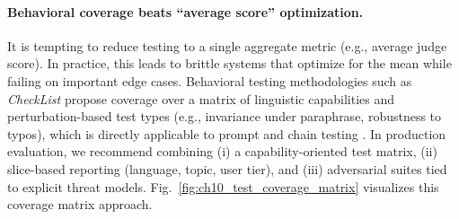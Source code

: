 \paragraph{Behavioral coverage beats ``average score'' optimization.}
It is tempting to reduce testing to a single aggregate metric (e.g., average judge score). In practice, this leads to brittle systems that optimize for the mean while failing on important edge cases.
Behavioral testing methodologies such as \emph{CheckList} propose coverage over a matrix of linguistic capabilities and perturbation-based test types (e.g., invariance under paraphrase, robustness to typos), which is directly applicable to prompt and chain testing \cite{ribeiro2020checklist}.
In production evaluation, we recommend combining (i) a capability-oriented test matrix, (ii) slice-based reporting (language, topic, user tier), and (iii) adversarial suites tied to explicit threat models.
Fig.~\ref{fig:ch10_test_coverage_matrix} visualizes this coverage matrix approach.

